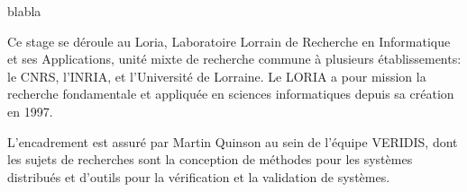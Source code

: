 {\color{white} blabla} \vspace{7cm}

Ce stage se déroule au Loria, Laboratoire Lorrain de Recherche en Informatique
et ses Applications, unité mixte de recherche commune à plusieurs
établissements: le CNRS, l'INRIA, et l'Université de Lorraine. Le LORIA a pour
mission la recherche fondamentale et appliquée en sciences informatiques depuis sa création en 1997.

L'encadrement est assuré par Martin Quinson au sein de l'équipe VERIDIS, dont les sujets de recherches sont la conception de méthodes pour les systèmes distribués et d'outils pour la vérification et la validation de systèmes.


